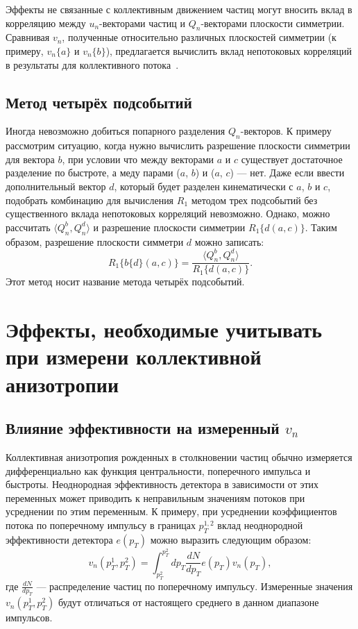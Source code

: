 Эффекты не связанные с коллективным движением частиц могут вносить вклад в корреляцию между $u_n$-векторами частиц и $Q_n$-векторами плоскости симметрии.
Сравнивая $v_n$, полученные относительно различных плоскостей симметрии (к примеру, $v_n\{a\}$ и $v_n\{b\}$), предлагается вычислить вклад непотоковых корреляций в результаты для коллективного потока~\cite{Mamaev:2020qom,Mamaev:2023fpr,Mamaev:2023yhz,Mamaev:2024}. 

\subsection{Метод четырёх подсобытий}

Иногда невозможно добиться попарного разделения $Q_n$-векторов. 
К примеру рассмотрим ситуацию, когда нужно вычислить разрешение плоскости симметрии для вектора $b$, при условии что между векторами $a$ и $c$ существует достаточное разделение по быстроте, а меду парами ($a$, $b$) и ($a$, $c$) --- нет.
Даже если ввести дополнительный вектор $d$, который будет разделен кинематически с $a$, $b$ и $c$, подобрать комбинацию для вычисления $R_1$ методом трех подсобытий без существенного вклада непотоковых корреляций невозможно.
Однако, можно рассчитать $\langle Q_n^b, Q_n^d \rangle$ и разрешение плоскости симметрии $R_1\{d(a,c)\}$.
Таким образом, разрешение плоскости симметри $d$ можно записать:
\begin{equation}
    R_1\{ b\{d\}(a,c) \} = \frac{ \langle Q_n^b, Q_n^d \rangle }{ R_1\{d(a,c)\} }.
    \label{eq:r1_4sub}
\end{equation}
Этот метод носит название метода четырёх подсобытий.

\section{Эффекты, необходимые учитывать при измерени коллективной анизотропии}

\subsection{Влияние эффективности на измеренный $v_n$}

Коллективная анизотропия рожденных в столкновении частиц обычно измеряется дифференциально как функция центральности, поперечного импульса и быстроты.
Неоднородная эффективность детектора в зависимости от этих переменных может приводить к неправильным значениям потоков при усреднении по этим переменным.
К примеру, при усреднении коэффициентов потока по поперечному импульсу в границах $p_T^{1,2}$ вклад неоднородной эффективности детектора $e(p_T)$ можно выразить следующим образом:
\begin{equation}
    v_n(p_T^1, p_T^2) = \int_{p_T^2}^{p_T^2} dp_T \frac{dN}{dp_T} e(p_T) v_n(p_T),
\end{equation}
где $\frac{dN}{dp_T}$ --- распределение частиц по поперечному импульсу.
Измеренные значения $v_n(p_T^1, p_T^2)$ будут отличаться от настоящего среднего в данном диапазоне импульсов.

